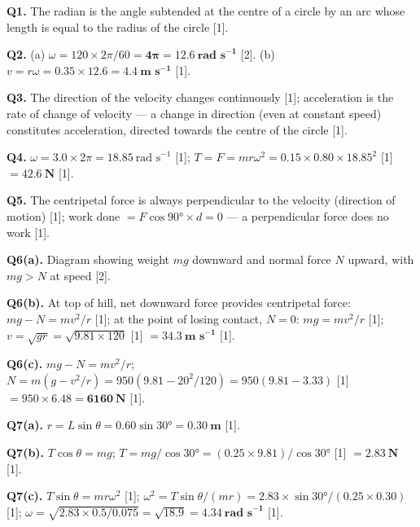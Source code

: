 \begin{markscheme}

\textbf{Q1.} The radian is the angle subtended at the centre of a circle by an arc whose length is equal to the radius of the circle [1].

\vspace{0.5em}\textbf{Q2.} (a) $\omega = 120 \times 2\pi/60 = \mathbf{4\pi = 12.6\ \text{rad s}^{-1}}$ [2]. (b) $v = r\omega = 0.35 \times 12.6 = \mathbf{4.4\ \text{m s}^{-1}}$ [1].

\vspace{0.5em}\textbf{Q3.} The direction of the velocity changes continuously [1]; acceleration is the rate of change of velocity — a change in direction (even at constant speed) constitutes acceleration, directed towards the centre of the circle [1].

\vspace{0.5em}\textbf{Q4.} $\omega = 3.0 \times 2\pi = 18.85\ \text{rad s}^{-1}$ [1]; $T = F = mr\omega^2 = 0.15 \times 0.80 \times 18.85^2$ [1] $= \mathbf{42.6\ \text{N}}$ [1].

\vspace{0.5em}\textbf{Q5.} The centripetal force is always perpendicular to the velocity (direction of motion) [1]; work done $= F\cos 90° \times d = 0$ — a perpendicular force does no work [1].

\vspace{0.5em}\textbf{Q6(a).} Diagram showing weight $mg$ downward and normal force $N$ upward, with $mg > N$ at speed [2].

\vspace{0.5em}\textbf{Q6(b).} At top of hill, net downward force provides centripetal force: $mg - N = mv^2/r$ [1]; at the point of losing contact, $N = 0$: $mg = mv^2/r$ [1]; $v = \sqrt{gr} = \sqrt{9.81 \times 120}$ [1] $= \mathbf{34.3\ \text{m s}^{-1}}$ [1].

\vspace{0.5em}\textbf{Q6(c).} $mg - N = mv^2/r$; $N = m(g - v^2/r) = 950(9.81 - 20^2/120) = 950(9.81 - 3.33)$ [1] $= 950 \times 6.48 = \mathbf{6160\ \text{N}}$ [1].

\vspace{0.5em}\textbf{Q7(a).} $r = L\sin\theta = 0.60\sin 30° = \mathbf{0.30\ \text{m}}$ [1].

\vspace{0.5em}\textbf{Q7(b).} $T\cos\theta = mg$; $T = mg/\cos 30° = (0.25 \times 9.81)/\cos 30°$ [1] $= \mathbf{2.83\ \text{N}}$ [1].

\vspace{0.5em}\textbf{Q7(c).} $T\sin\theta = mr\omega^2$ [1]; $\omega^2 = T\sin\theta/(mr) = 2.83\times\sin 30°/(0.25\times 0.30)$ [1]; $\omega = \sqrt{2.83\times0.5/0.075} = \sqrt{18.9} = \mathbf{4.34\ \text{rad s}^{-1}}$ [1].

\end{markscheme}

